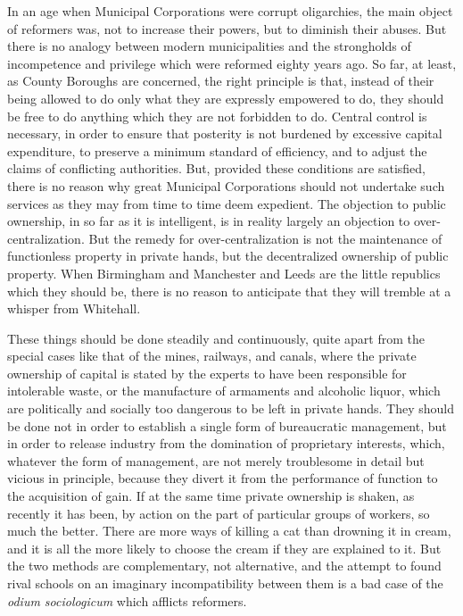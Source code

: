 \documentclass{book}
\begin{document}
In an age when Municipal Corporations were corrupt oligarchies, the main object of reformers was, not to increase their powers, but to diminish their abuses. But there is no analogy between modern municipalities and the strongholds of incompetence and privilege which were reformed eighty years ago. So far, at least, as County Boroughs are concerned, the right principle is that, instead of their being allowed to do only what they are expressly empowered to do, they should be free to do anything which they are not forbidden to do. Central control is necessary, in order to ensure that posterity is not burdened by excessive capital expenditure, to preserve a minimum standard of efficiency, and to adjust the claims of conflicting authorities. But, provided these conditions are satisfied, there is no reason why great Municipal Corporations should not undertake such services as they may from time to time deem expedient. The objection to public ownership, in so far as it is intelligent, is in reality largely an objection to over-centralization. But the remedy for over-centralization is not the maintenance of functionless property in private hands, but the decentralized ownership of public property. When Birmingham and Manchester and Leeds are the little republics which they should be, there is no reason to anticipate that they will tremble at a whisper from Whitehall.

These things should be done steadily and continuously, quite apart from the special cases like that of the mines, railways, and canals, where the private ownership of capital is stated by the experts to have been responsible for intolerable waste, or the manufacture of armaments and alcoholic liquor, which are politically and socially too dangerous to be left in private hands. They should be done not in order to establish a single form of bureaucratic management, but in order to release industry from the domination of proprietary interests, which, whatever the form of management, are not merely troublesome in detail but vicious in principle, because they divert it from the performance of function to the acquisition of gain. If at the same time private ownership is shaken, as recently it has been, by action on the part of particular groups of workers, so much the better. There are more ways of killing a cat than drowning it in cream, and it is all the more likely to choose the cream if they are explained to it. But the two methods are complementary, not alternative, and the attempt to found rival schools on an imaginary incompatibility between them is a bad case of the \emph{odium sociologicum} which afflicts reformers.
\end{document}
